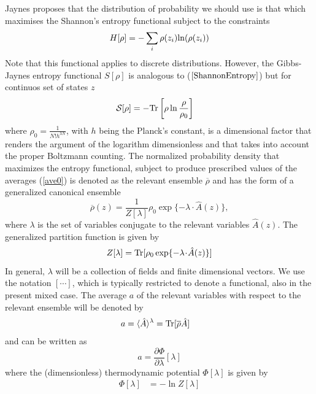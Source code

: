 \documentclass[b5paper,openright,11pt]{book}
\begin{document}
Jaynes \cite{Jaynes1957} proposes that the distribution of probability we should use is that which maximises the Shannon's entropy functional subject to the constraints  
\begin{align}
    H[\rho] = -\sum_i\rho(z_i){\rm ln}(\rho(z_i))
    \label{ShannonEntropy}
\end{align}
Note that this functional applies to discrete distributions. However, the Gibbs-Jaynes entropy functional $S[\rho]$ is analogous to ($\ref{ShannonEntropy}$) but for continuos set of states $z$
\begin{align}
 {\cal S}[\rho]&=-{\rm Tr}\left[\rho\ln\frac{\rho}{\rho_0}\right]
\label{entropy}
\end{align}
where  $\rho_0=\frac{1}{N!h^{3N}}$,   with  $h$  being   the  Planck's
constant, is  a dimensional  factor that renders  the argument  of the
logarithm  dimensionless  and  that  takes  into  account  the  proper
Boltzmann  counting.  The normalized  probability  density  that maximizes  the
entropy  functional,  subject  to  produce prescribed  values  of  the
averages  (\ref{ave0})  is  denoted  as the relevant  ensemble
$\overline{\rho}$ and has the form of a generalized canonical ensemble
\begin{equation}
\overline{\rho}(z) = \frac{1}{Z[\lambda]} \rho_0\exp\{-\lambda\!\cdot\!\hat{A}(z)\}, 
\label{relens1}
\end{equation}
where
$\lambda$ is the set of variables conjugate  to the relevant
variables $\hat{A}(z)$.  The generalized partition function is given by
\begin{equation}
Z[\lambda] = {\rm Tr}[\rho_0\exp
    \{-\lambda\!\cdot\!\hat{A}(z)\}]
\end{equation}
In general, $\lambda$  will be a collection of  fields and finite
dimensional  vectors.  We  use  the notation  $[\cdots]$,  which  is
typically restricted  to denote  a functional,  also in  the present
mixed case.  The average $a$ of the relevant variables with respect
to the relevant ensemble will be denoted by
\begin{align}
  a &=\langle \hat{A}\rangle^\lambda ={\rm Tr}[\overline{\rho}\hat{A}]
\end{align}
and can be written as 
\begin{equation}
a =\frac{\partial \Phi}{\partial
\lambda}[\lambda] 
\label{cg1}
\end{equation}
where the  (dimensionless) thermodynamic potential  $\Phi[\lambda]$ is
given by
\begin{align}
  \Phi[\lambda]&=-\ln Z[\lambda]
    \label{PhiLambda}
\end{align}
\end{document}
